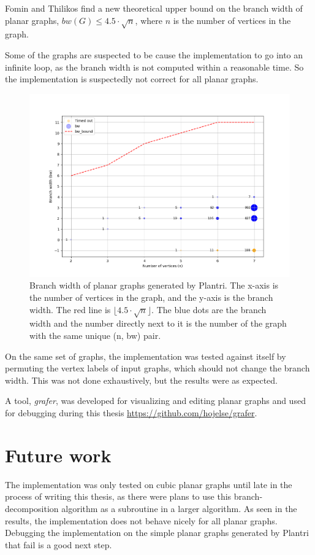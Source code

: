\documentclass{article}
\begin{document}
	Fomin and Thilikos\cite{FT06} find a new theoretical upper bound on the branch width of planar graphs, $bw(G) \leq 4.5 \cdot \sqrt{n}$, where $n$ is the number of vertices in the graph.

	Some of the graphs are suspected to be cause the implementation to go into an infinite loop, as the branch width is not computed within a reasonable time. So the implementation is suspectedly not correct for all planar graphs.

	\begin{figure}[H]
		\centering
		\includegraphics[width=\textwidth]{./images/bw-planar.png}
		\caption{Branch width of planar graphs generated by Plantri. The x-axis is the number of vertices in the graph, and the y-axis is the branch width. The red line is $\lfloor 4.5 \cdot \sqrt{n} \rfloor$. The blue dots are the branch width and the number directly next to it is the number of the graph with the same unique (n, bw) pair.}
		\label{fig:bw-planar}
	\end{figure}

	On the same set of graphs, the implementation was tested against itself by permuting the vertex labels of input graphs, which should not change the branch width. This was not done exhaustively, but the results were as expected.

	A tool, \textit{grafer}, was developed for visualizing and editing planar graphs and used for debugging during this thesis \url{https://github.com/hojelse/grafer}.

\section{Future work}
	The implementation was only tested on cubic planar graphs until late in the process of writing this thesis, as there were plans to use this branch-decomposition algorithm as a subroutine in a larger algorithm. As seen in the results, the implementation does not behave nicely for all planar graphs. Debugging the implementation on the simple planar graphs generated by Plantri that fail is a good next step.
\end{document}
